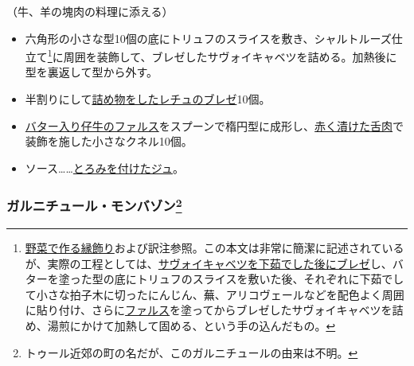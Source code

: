 \begin{recette}

（牛、羊の塊肉の料理に添える）

\begin{itemize}
\item
  六角形の小さな型10個の底にトリュフのスライスを敷き、シャルトルーズ仕立て\footnote{\protect\hyperlink{bordures-en-legumes}{野菜で作る縁飾り}および訳注参照。この本文は非常に簡潔に記述されているが、実際の工程としては、\protect\hyperlink{chou-braise}{サヴォイキャベツを下茹でした後にブレゼ}し、バターを塗った型の底にトリュフのスライスを敷いた後、それぞれに下茹でして小さな拍子木に切ったにんじん、蕪、アリコヴェールなどを配色よく周囲に貼り付け、さらに\protect\hyperlink{farce-a}{ファルス}を塗ってからブレゼしたサヴォイキャベツを詰め、湯煎にかけて加熱して固める、という手の込んだもの。}に周囲を装飾して、ブレゼしたサヴォイキャベツを詰める。加熱後に型を裏返して型から外す。
\item
  半割りにして\protect\hyperlink{laitues-farcies-pour-garniture}{詰め物をしたレチュのブレゼ}10個。
\item
  \protect\hyperlink{farce-b}{バター入り仔牛のファルス}をスプーンで楕円型に成形し、\protect\hyperlink{saumure-liquide-pour-langues}{赤く漬けた舌肉}で装飾を施した小さなクネル10個。
\item
  ソース\ldots{}\ldots{}\protect\hyperlink{jus-de-veau-lie}{とろみを付けたジュ}。
\end{itemize}

\hypertarget{garniture-montbazon}{%
\subsubsection[ガルニチュール・モンバゾン]{\texorpdfstring{ガルニチュール・モンバゾン\footnote{トゥール近郊の町の名だが、このガルニチュールの由来は不明。}}{ガルニチュール・モンバゾン}}\label{garniture-montbazon}}




\end{recette}
